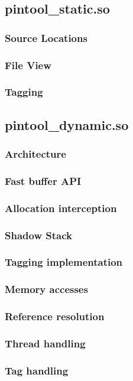 \subsection{pintool\_static.so}
\subsubsection{Source Locations}
\subsubsection{File View}
\subsubsection{Tagging}

\subsection{pintool\_dynamic.so}
\subsubsection{Architecture}
\subsubsection{Fast buffer API}
\subsubsection{Allocation interception}
\subsubsection{Shadow Stack}
\subsubsection{Tagging implementation}
\subsubsection{Memory accesses}
\subsubsection{Reference resolution}
\subsubsection{Thread handling}
\subsubsection{Tag handling}

